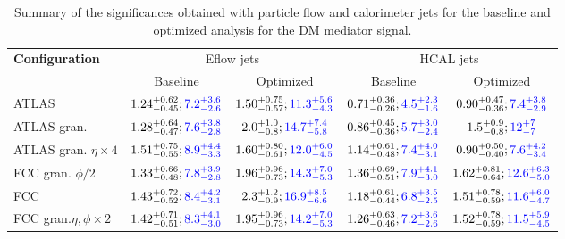 \begin{table}[h]
	\caption{Summary of the significances obtained with particle flow and calorimeter jets for the baseline and optimized analysis for the DM mediator signal.}
	\label{table:sum_DM}
	\centering
	\begin{tabular}{lcccc}
		\hline
		\multirow{2}{*}{\textbf{Configuration}} & \multicolumn{2}{c}{Eflow jets}    & \multicolumn{2}{c}{HCAL jets} \\ \cline{2-5} 
		& Baseline & Optimized & Baseline  & Optimized           \\ \midrule \midrule
		ATLAS& $1.24^{+0.62}_{-0.45};\textcolor{blue}{7.2^{+3.6}_{-2.6}}$& $1.50^{+0.75}_{-0.57};\textcolor{blue}{11.3^{+5.6}_{-4.3}}$  & $0.71^{+0.36}_{-0.26};\textcolor{blue}{4.5^{+2.3}_{-1.6}}$  & $0.90^{+0.47}_{-0.36};\textcolor{blue}{7.4^{+3.8}_{-2.9}}$           \\ 
		\rowcolor{black!7}ATLAS gran.& $1.28^{+0.64}_{-0.47};\textcolor{blue}{7.6^{+3.8}_{-2.8}}$ & $2.0^{+1.0}_{-0.8};\textcolor{blue}{14.7^{+7.4}_{-5.8}}$ & $0.86^{+0.45}_{-0.36};\textcolor{blue}{5.7^{+3.0}_{-2.4}}$ & $1.5^{+0.9}_{-0.8};\textcolor{blue}{12^{+7}_{-7}}$          \\ 
		ATLAS gran. $\eta\times 4$& $1.51^{+0.75}_{-0.55};\textcolor{blue}{8.9^{+4.4}_{-3.3}}$ & $1.60^{+0.80}_{-0.61};\textcolor{blue}{12.0^{+6.0}_{-4.5}}$ & $1.14^{+0.61}_{-0.48};\textcolor{blue}{7.4^{+4.0}_{-3.1}}$& $0.90^{+0.50}_{-0.40};\textcolor{blue}{7.6^{+4.2}_{-3.4}}$    \\ 
		\rowcolor{black!7}FCC gran. $\phi/2$& $1.33^{+0.66}_{-0.48};\textcolor{blue}{7.8^{+3.9}_{-2.8}}$ & $1.96^{+0.96}_{-0.73};\textcolor{blue}{14.3^{+7.0}_{-5.3}}$ & $1.36^{+0.69}_{-0.51};\textcolor{blue}{7.9^{+4.1}_{-3.0}}$ & $1.62^{+0.81}_{-0.64};\textcolor{blue}{12.6^{+6.3}_{-5.0}}$           \\ 
		FCC& $1.43^{+0.72}_{-0.52};\textcolor{blue}{8.4^{+4.2}_{-3.1}}$ & $2.3^{+1.2}_{-0.9};\textcolor{blue}{16.9^{+8.5}_{-6.6}}$ & $1.18^{+0.61}_{-0.44};\textcolor{blue}{6.8^{+3.5}_{-2.5}}$ & $1.51^{+0.78}_{-0.59};\textcolor{blue}{11.6^{+6.0}_{-4.7}}$           \\ 
		\rowcolor{black!7}FCC gran.$\eta,\phi \times 2$& $1.42^{+0.71}_{-0.51};\textcolor{blue}{8.3^{+4.1}_{-3.0}}$ & $1.95^{+0.96}_{-0.73};\textcolor{blue}{14.2^{+7.0}_{-5.3}}$ & $1.26^{+0.63}_{-0.46};\textcolor{blue}{7.2^{+3.6}_{-2.6}}$ & $1.52^{+0.78}_{-0.59};\textcolor{blue}{11.5^{+5.9}_{-4.5}}$ \\ \bottomrule
	\end{tabular}
	
\end{table}

